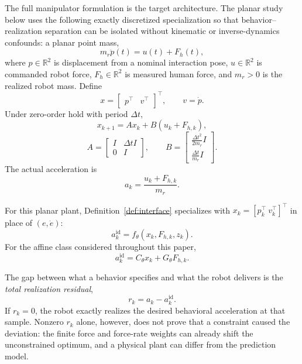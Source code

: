 \documentclass[journal]{IEEEtran}
\begin{document}
The full manipulator formulation is the target architecture. The planar
study below uses the following exactly discretized specialization so
that behavior--realization separation can be isolated without kinematic
or inverse-dynamics confounds: a planar point mass,
\begin{equation}
m_r\ddot p(t)=u(t)+F_h(t),
\end{equation}
where $p\in\mathbb R^2$ is displacement from a nominal interaction pose,
$u\in\mathbb R^2$ is commanded robot force, $F_h\in\mathbb R^2$ is
measured human force, and $m_r>0$ is the realized robot mass. Define
\begin{equation}
x=\begin{bmatrix}p^\top&v^\top\end{bmatrix}^\top,\qquad v=\dot p.
\end{equation}
Under zero-order hold with period $\Delta t$,
\begin{equation}
x_{k+1}=Ax_k+B(u_k+F_{h,k}),
\end{equation}
\begin{equation}
A= \begin{bmatrix} I&\Delta tI\\0&I \end{bmatrix}, \qquad
B= \begin{bmatrix} \frac{\Delta t^2}{2m_r}I\\ \frac{\Delta t}{m_r}I \end{bmatrix}.
\end{equation}
The actual acceleration is
\begin{equation}
a_k=\frac{u_k+F_{h,k}}{m_r}.
\end{equation}

For this planar plant, Definition~\ref{def:interface} specializes with
$x_k=[p_k^\top\ v_k^\top]^\top$ in place of $(e,\dot e)$:
\begin{equation}
a_k^{\mathrm{id}} =f_\theta(x_k,F_{h,k},z_k).
\end{equation}
For the affine class considered throughout this paper,
\begin{equation}
a_k^{\mathrm{id}}=C_\theta x_k+G_\theta F_{h,k}.
\end{equation}

The gap between what a behavior specifies and what the robot delivers is
the \emph{total realization residual},
\begin{equation}
r_k=a_k-a_k^{\mathrm{id}}.
\end{equation}
If $r_k=0$, the robot exactly realizes the desired behavioral
acceleration at that sample. Nonzero $r_k$ alone, however, does not prove
that a constraint caused the deviation: the finite force and force-rate
weights can already shift the unconstrained optimum, and a physical plant
can differ from the prediction model.
\end{document}
